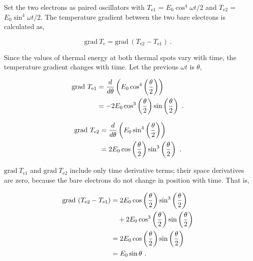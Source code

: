 \documentclass[%
 reprint,
 amsmath,amssymb,
 aps,
]{revtex4-1}
\numberwithin{equation}{section}%
\begin{document}
    Set the two electrons as paired oscillators with $T_{\mathrm{e1}}$ = $E_{0} \cos^{4} \omega t /2$ and $T_{\mathrm{e2}}$ = $E_{0} \sin^{4} \omega t /2$. The temperature gradient between the two bare electrons is calculated as,

    \begin{equation}
            \mathrm{grad} \ T_e = \mathrm{grad} \ ( T_{\mathrm{e2}} - T_{\mathrm{e1}} )
            \ .
            \label{e3_k_grad_Te2-Te1}
    \end{equation}


    Since the values of thermal energy at both thermal spots vary with time, the temperature gradient changes with time. Let the previous $\omega t$ is $\theta$,


        \begin{align}
            \mathrm{grad} \ T_{\mathrm{e1}}
                &= \frac{d}{d \theta} \left( E_{0} \cos^{4} \left( \frac{\theta}{2} \right) \right) \notag \\
                &= - 2 E_{0} \cos^{3} \left( \frac{\theta}{2} \right) \sin \left( \frac{\theta}{2} \right)
                \ .
                \label{e3_gradT_e1}
        \end{align}

        \begin{align}
            \mathrm{grad} \ T_{\mathrm{e2}}
                &= \frac{d}{d \theta} \left( E_{0} \sin^{4} \left( \frac{\theta}{2} \right) \right) \notag \\
                &=   2 E_{0} \cos \left( \frac{\theta}{2} \right) \sin^{3} \left( \frac{\theta}{2} \right)
                \ .
                \label{e3_gradT_e2}
        \end{align}        


        
    $\mathrm{grad} \ T_{\mathrm{e1}}$ and $\mathrm{grad} \ T_{\mathrm{e2}}$ include only time derivative terms; their space derivatives are zero, because the bare electrons do not change in position with time. That is,


        \begin{align}
            \mathrm{grad} \ (T_{\mathrm{e2}} - T_{\mathrm{e1}})
                &= 2 E_{0} \cos \left( \frac{\theta}{2} \right) \sin^{3} \left( \frac{\theta}{2} \right) \notag \\
                & \quad + 2 E_{0} \cos^{3} \left( \frac{\theta}{2} \right) \sin \left( \frac{\theta}{2} \right) \notag \\
                &= 2 E_{0} \cos \left( \frac{\theta}{2} \right) \sin \left( \frac{\theta}{2} \right) \notag \\
                &= E_{0} \sin \theta
                \ .
            \label{e3_simple_harmonic_motion}
        \end{align}
\end{document}
